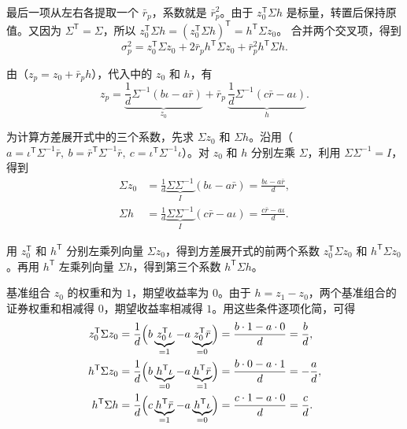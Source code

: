 最后一项从左右各提取一个 $\bar r_p$，系数就是 $\bar r_p^2$。由于 $z_0^{\mathsf T}\Sigma h$ 是标量，转置后保持原值。又因为 $\Sigma^{\mathsf T}=\Sigma$，所以
$z_0^{\mathsf T}\Sigma h=(z_0^{\mathsf T}\Sigma h)^{\mathsf T}=h^{\mathsf T}\Sigma z_0$。
合并两个交叉项，得到
\[
 \sigma_p^2=z_0^{\mathsf T}\Sigma z_0
 +2\bar r_p h^{\mathsf T}\Sigma z_0
 +\bar r_p^2 h^{\mathsf T}\Sigma h.
\]

由（$z_p=z_0+\bar r_p h$），代入中的 $z_0$ 和 $h$，有
\[
 z_p
 =\underbrace{\frac1d\Sigma^{-1}(b\iota-a\bar r)}_{z_0}
 +\bar r_p\,\underbrace{\frac1d\Sigma^{-1}(c\bar r-a\iota)}_{h}.
\]

为计算方差展开式中的三个系数，先求 $\Sigma z_0$ 和 $\Sigma h$。沿用（$a=\iota^{\mathsf T}\Sigma^{-1}\bar r,\ b=\bar r^{\mathsf T}\Sigma^{-1}\bar r,\ c=\iota^{\mathsf T}\Sigma^{-1}\iota$）。对 $z_0$ 和 $h$ 分别左乘 $\Sigma$，利用 $\Sigma\Sigma^{-1}=I$，得到
\[
 \begin{aligned}
 \Sigma z_0
 &=\frac1d\underbrace{\Sigma\Sigma^{-1}}_{I}(b\iota-a\bar r)
 =\frac{b\iota-a\bar r}{d},\\
 \Sigma h
 &=\frac1d\underbrace{\Sigma\Sigma^{-1}}_{I}(c\bar r-a\iota)
 =\frac{c\bar r-a\iota}{d}.
 \end{aligned}
\]

用 $z_0^{\mathsf T}$ 和 $h^{\mathsf T}$ 分别左乘列向量 $\Sigma z_0$，得到方差展开式的前两个系数 $z_0^{\mathsf T}\Sigma z_0$ 和 $h^{\mathsf T}\Sigma z_0$。再用 $h^{\mathsf T}$ 左乘列向量 $\Sigma h$，得到第三个系数 $h^{\mathsf T}\Sigma h$。

基准组合 $z_0$ 的权重和为 $1$，期望收益率为 $0$。由于 $h=z_1-z_0$，两个基准组合的证券权重和相减得 $0$，期望收益率相减得 $1$。用这些条件逐项化简，可得
\[
 \begin{aligned}
 z_0^{\mathsf T}\Sigma z_0
 &=\frac1d\Bigl(b\underbrace{z_0^{\mathsf T}\iota}_{=1}
             -a\underbrace{z_0^{\mathsf T}\bar r}_{=0}\Bigr)
 =\frac{b\cdot1-a\cdot0}{d}=\frac bd,\\
 h^{\mathsf T}\Sigma z_0
 &=\frac1d\Bigl(b\underbrace{h^{\mathsf T}\iota}_{=0}
             -a\underbrace{h^{\mathsf T}\bar r}_{=1}\Bigr)
 =\frac{b\cdot0-a\cdot1}{d}=-\frac ad,\\
 h^{\mathsf T}\Sigma h
 &=\frac1d\Bigl(c\underbrace{h^{\mathsf T}\bar r}_{=1}
             -a\underbrace{h^{\mathsf T}\iota}_{=0}\Bigr)
 =\frac{c\cdot1-a\cdot0}{d}=\frac cd.
 \end{aligned}
\]

